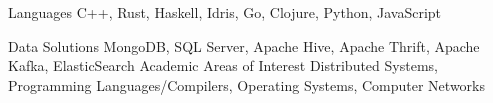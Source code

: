 


\begin{cvskills}


  \cvskill
  {Languages} %
  {C++, Rust, Haskell, Idris, Go, Clojure, Python, JavaScript} %

  \cvskill
  {Data Solutions}
  {MongoDB, SQL Server, Apache Hive, Apache Thrift, Apache Kafka, ElasticSearch} %
  \cvskill
  {Academic Areas of Interest}
  {Distributed Systems, Programming Languages/Compilers, Operating Systems, Computer Networks}

\end{cvskills}
